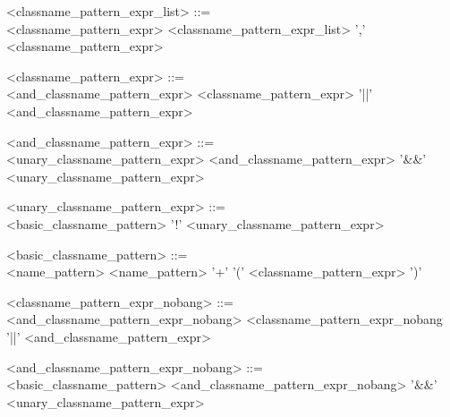 \begin{minipage}{6in}
\begin{blue}
\begin{grammar}
<classname_pattern_expr_list> ::= \hspace{1in} \\
     <classname_pattern_expr> 
\alt <classname_pattern_expr_list> ',' <classname_pattern_expr>

<classname_pattern_expr> ::= \hspace{1in} \\
     <and_classname_pattern_expr>
\alt <classname_pattern_expr> '||' <and_classname_pattern_expr>

<and_classname_pattern_expr> ::= \hspace{1in} \\
     <unary_classname_pattern_expr>
\alt <and_classname_pattern_expr> '\&\&' <unary_classname_pattern_expr>

<unary_classname_pattern_expr> ::= \hspace{1in} \\
     <basic_classname_pattern>
\alt '!' <unary_classname_pattern_expr>

<basic_classname_pattern> ::=  \hspace{1in} \\
     <name_pattern>
\alt <name_pattern> '+'
\alt '(' <classname_pattern_expr> ')'
\end{grammar}
\end{blue}
\end{minipage}

\begin{minipage}{6in}
\begin{blue}
\begin{grammar}
<classname_pattern_expr_nobang> ::= \hspace{1in} \\
    <and_classname_pattern_expr_nobang>
\alt <classname_pattern_expr_nobang '||' <and_classname_pattern_expr>

<and_classname_pattern_expr_nobang> ::= \hspace{1in} \\
     <basic_classname_pattern>
\alt <and_classname_pattern_expr_nobang> '\&\&' <unary_classname_pattern_expr>
\end{grammar}
\end{blue}
\end{minipage}

